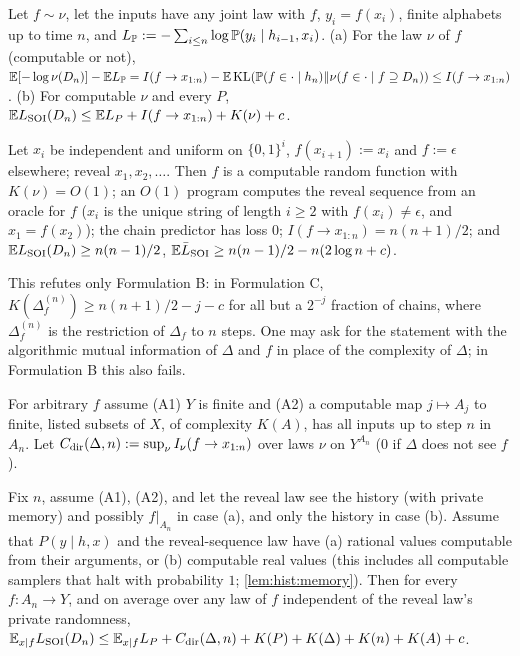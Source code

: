 \begin{theorem}\label{thm:hist:directed}
Let $f\sim\nu$, let the inputs have any joint law with $f$, $y_i=f(x_i)$, finite alphabets up to time $n$, and $L_{\mathbb{P}}:=-\sum_{i\le n}\log\mathbb{P}(y_i\mid h_{i-1},x_i)$. (a) For the law $\nu$ of $f$ (computable or not), $\mathbb{E}[-\log\nu(D_n)]-\mathbb{E} L_{\mathbb{P}}=I(f\to x_{1:n})-\mathbb{E}\operatorname{KL}(\mathbb{P}(f\in\cdot\mid h_n)\Vert\nu(f\in\cdot\mid f\supseteq D_n))\le I(f\to x_{1:n})$. (b) For computable $\nu$ and every $P$, $\mathbb{E}L_{\mathrm{SOI}}(D_n)\le\mathbb{E} L_P+I(f\to x_{1:n})+K(\nu)+c$.
\end{theorem}

\begin{theorem}\label{thm:hist:randchain}
Let $x_i$ be independent and uniform on $\{0,1\}^i$, $f(x_{i+1}):=x_i$ and $f:=\epsilon$ elsewhere; reveal $x_1,x_2,\dots$. Then $f$ is a computable random function with $K(\nu)=O(1)$; an $O(1)$ program computes the reveal sequence from an oracle for $f$ ($x_i$ is the unique string of length $i\ge2$ with $f(x_i)\ne\epsilon$, and $x_1=f(x_2)$); the chain predictor has loss $0$; $I(f\to x_{1:n})=n(n+1)/2$; and $\mathbb{E}L_{\mathrm{SOI}}(D_n)\ge n(n-1)/2$, $\mathbb{E}\bar{L}_{\mathrm{SOI}}\ge n(n-1)/2-n(2\log n+c)$.
\end{theorem}

This refutes only Formulation B: in Formulation C, $K(\Delta^{(n)}_f)\ge n(n+1)/2-j-c$ for all but a $2^{-j}$ fraction of chains, where $\Delta^{(n)}_f$ is the restriction of $\Delta_f$ to $n$ steps. One may ask for the statement with the algorithmic mutual information of $\Delta$ and $f$ in place of the complexity of $\Delta$; in Formulation B this also fails.

For arbitrary $f$ assume (A1) $Y$ is finite and (A2) a computable map $j\mapsto A_j$ to finite, listed subsets of $X$, of complexity $K(A)$, has all inputs up to step $n$ in $A_n$. Let $C_{\rm dir}(\Delta,n):=\sup_\nu I_\nu(f\to x_{1:n})$ over laws $\nu$ on $Y^{A_n}$ ($0$ if $\Delta$ does not see $f$).

\begin{theorem}\label{thm:hist:minimax}
Fix $n$, assume (A1), (A2), and let the reveal law see the history (with private memory) and possibly $f|_{A_n}$ in case (a), and only the history in case (b). Assume that $P(y\mid h,x)$ and the reveal-sequence law have (a) rational values computable from their arguments, or (b) computable real values (this includes all computable samplers that halt with probability $1$; \cref{lem:hist:memory}). Then for every $f:A_n\to Y$, and on average over any law of $f$ independent of the reveal law's private randomness,
$\mathbb{E}_{x\mid f}L_{\mathrm{SOI}}(D_n)\le\mathbb{E}_{x\mid f}L_P+C_{\rm dir}(\Delta,n)+K(P)+K(\Delta)+K(n)+K(A)+c$.
\end{theorem}


